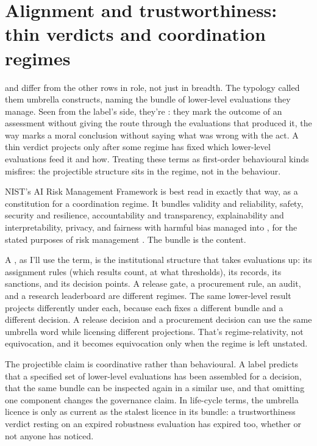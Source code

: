 \documentclass[12pt]{article}
\begin{document}
\section{Alignment and trustworthiness: thin verdicts and coordination regimes}\label{sec:governance}

 and  differ from the other rows in
role, not just in breadth. The typology called them umbrella constructs,
naming the bundle of lower-level evaluations they manage. Seen from the
label's side, they're : they mark the outcome of an
assessment without giving the route through the evaluations that produced it,
the way  marks a moral conclusion without saying what was wrong
with the act. A thin verdict projects only after some regime has fixed which
lower-level evaluations feed it and how. Treating these terms as first-order
behavioural kinds misfires: the projectible structure sits in the
regime, not in the behaviour.

NIST's AI Risk Management Framework is best read in exactly that way, as a
constitution for a coordination regime. It bundles validity and reliability,
safety, security and resilience, accountability and transparency,
explainability and interpretability, privacy, and fairness with harmful bias
managed into , for the stated purposes of risk management
\citep{nist2023artificial}. The bundle is the content.

A , as I'll use the term, is the institutional
structure that takes evaluations up: its assignment rules (which results count,
at what thresholds), its records, its sanctions, and its decision points. A
release gate, a procurement rule, an audit, and a research leaderboard are
different regimes. The same lower-level result projects differently under each,
because each fixes a different bundle and a different decision. A release
decision and a procurement decision can use the same umbrella word while
licensing different projections. That's regime-relativity, not equivocation,
and it becomes equivocation only when the regime is left unstated.

The projectible claim is coordinative rather than behavioural. A
 label predicts that a specified set of lower-level
evaluations has been assembled for a decision, that the same bundle can be
inspected again in a similar use, and that omitting one component changes the
governance claim. In life-cycle terms, the umbrella licence is only as current
as the stalest licence in its bundle: a trustworthiness verdict resting on an
expired robustness evaluation has expired too, whether or not anyone has
noticed.
\end{document}
